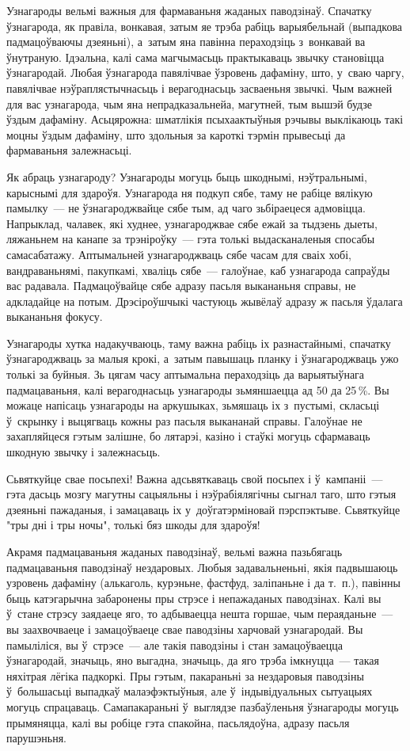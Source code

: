 Узнагароды вельмі важныя для фармаваньня жаданых паводзінаў. Спачатку ўзнагарода, як правіла, вонкавая, затым яе трэба рабіць варыябельнай (выпадкова падмацоўваючы дзеяньні), а~затым яна павінна пераходзіць з~вонкавай ва ўнутраную. Ідэальна, калі сама магчымасьць практыкаваць звычку становіцца ўзнагародай. Любая ўзнагарода павялічвае ўзровень дафаміну, што, у~сваю чаргу, павялічвае нэўраплястычнасьць і верагоднасьць засваеньня звычкі. Чым важней для вас узнагарода, чым яна непрадказальнейа, магутней, тым вышэй будзе ўздым дафаміну. Асьцярожна: шматлікія псыхаактыўныя рэчывы выклікаюць такі моцны ўздым дафаміну, што здольныя за кароткі тэрмін прывесьці да фармаваньня залежнасьці.

Як абраць узнагароду? Узнагароды могуць быць шкоднымі, нэўтральнымі, карыснымі для здароўя. Узнагарода ня подкуп сябе, таму не рабіце вялікую памылку~--- не ўзнагароджвайце сябе тым, ад чаго зьбіраецеся адмовіцца. Напрыклад, чалавек, які худнее, узнагароджвае сябе ежай за тыдзень дыеты, ляжаньнем на канапе за трэніроўку~--- гэта толькі выдасканаленыя спосабы самасабатажу. Аптымальней узнагароджваць сябе часам для сваіх хобі, вандраваньнямі, пакупкамі, хваліць сябе~--- галоўнае, каб узнагарода сапраўды вас радавала. Падмацоўвайце сябе адразу пасьля выкананьня справы, не адкладайце на потым. Дрэсіроўшчыкі частуюць жывёлаў адразу ж пасьля ўдалага выкананьня фокусу.

Узнагароды хутка надакучваюць, таму важна рабіць іх разнастайнымі, спачатку ўзнагароджваць за малыя крокі, а~затым павышаць планку і ўзнагароджваць ужо толькі за буйныя. Зь цягам часу аптымальна пераходзіць да варыятыўнага падмацаваньня, калі верагоднасьць узнагароды зьмяншаецца ад 50 да 25\,\%. Вы можаце напісаць узнагароды на аркушыках, зьмяшаць іх з~пустымі, скласьці ў~скрынку і выцягваць кожны раз пасьля выкананай справы. Галоўнае не захапляйцеся гэтым залішне, бо лятарэі, казіно і стаўкі могуць сфармаваць шкодную звычку і залежнасьць.

Сьвяткуйце свае посьпехі! Важна адсьвяткаваць свой посьпех і ў~кампаніі~--- гэта дасьць мозгу магутны сацыяльны і нэўрабіялягічны сыгнал таго, што гэтыя дзеяньні пажаданыя, і замацаваць іх у~доўгатэрміновай пэрспэктыве. Сьвяткуйце "тры дні і тры ночы", толькі бяз шкоды для здароўя!

Акрамя падмацаваньня жаданых паводзінаў, вельмі важна пазьбягаць падмацаваньня паводзінаў нездаровых. Любыя задавальненьні, якія падвышаюць узровень дафаміну (алькаголь, курэньне, фастфуд, заліпаньне і да т.~п.), павінны быць катэгарычна забаронены пры стрэсе і непажаданых паводзінах. Калі вы ў~стане стрэсу заядаеце яго, то адбываецца нешта горшае, чым пераяданьне~--- вы заахвочваеце і замацоўваеце свае паводзіны харчовай узнагародай. Вы памыліліся, вы ў~стрэсе~--- але такія паводзіны і стан замацоўваецца ўзнагародай, значыць, яно выгадна, значыць, да яго трэба імкнуцца~--- такая няхітрая лёгіка падкоркі. Пры гэтым, пакараньні за нездаровыя паводзіны ў~большасьці выпадкаў малаэфэктыўныя, але ў~індывідуальных сытуацыях могуць спрацаваць. Самапакараньні ў~выглядзе пазбаўленьня ўзнагароды могуць прымяняцца, калі вы робіце гэта спакойна, пасьлядоўна, адразу пасьля парушэньня.

